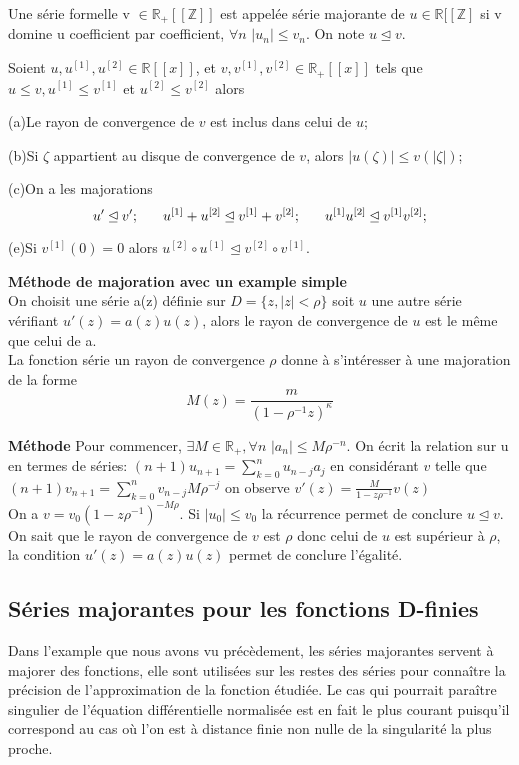 \documentclass[a4paper,10.5pt]{article}
\begin{document}
	\begin{definition} Une série formelle v $\in \mathbb{R}_{+}[[\mathbb{Z}]]$ est appelée série majorante de $ u \in \mathbb{R}[[\mathbb{Z}]$ si v domine u coefficient par coefficient, $\forall n$ $ |u_{n}|\leq v_{n}$. On note $u \unlhd v$.
	\end{definition}
	
	\begin{proposition} Soient $u,u^{[1]},u^{[2]}\in \mathbb{R}[[x]]$, et $v,v^{[1]},v^{[2]} \in \mathbb{R}_{+}[[x]]$ tels que $u\leq v,u^{[1]}\leq v^{[1]}$ et $u^{[2]}\leq v^{[2]}$ alors
		
		(a)Le rayon de convergence de $v$ est inclus dans celui de $u$;
		
		(b)Si $\zeta$ appartient au disque de convergence de $v$, alors $|u(\zeta)|\leq v(|\zeta|)$;
		
		(c)On a les majorations
		\[u' \unlhd v'; \hspace{6mm} u^{[1]}+u^{[2]}\unlhd v^{[1]}+v^{[2]}; \hspace{6mm}u^{[1]}u^{[2]}\unlhd v^{[1]}v^{[2]}; \]
		
		(e)Si $v^{[1]}(0)=0$ alors $ u^{[2]} \circ u^{[1]} \unlhd v^{[2]}\circ v^{[1]}$.
		
	\end{proposition}
	
	\noindent\textbf{Méthode de majoration avec un example simple}\\
	On choisit une série a(z) définie sur $D=\{z,|z|<\rho\}$ soit $u$ une autre série vérifiant $u'(z)=a(z)u(z)$, alors le rayon de convergence de $u$ est le même que celui de a.\\
	La fonction série un rayon de convergence $\rho$ donne à s'intéresser à une majoration de la forme
	\[M(z)=\frac{m}{(1-\rho^{-1} z)^{\kappa}}\] 
	
	\noindent\textbf{Méthode} Pour commencer, $\exists M \in \mathbb{R}_{+}, \forall n$ $|a_{n}|\leq M \rho^{-n}$.
	On écrit la relation sur u en termes de séries: $(n+1)u_{n+1}=\sum_{k=0}^{n}u_{n-j}a_{j}$ en considérant $v$ telle que  $(n+1)v_{n+1}=\sum_{k=0}^{n}v_{n-j}M\rho^{-j}$ on observe $v'(z)=\frac{M}{1-z\rho^{-1}}v(z)$ \\
	On a $v=v_{0}(1-z\rho^{-1})^{-M\rho}$. Si $|u_{0}| \leq v_{0}$ la récurrence permet de conclure $ u\unlhd v$. On sait que le rayon de convergence de $v$ est $\rho$ donc celui de $u$ est supérieur à $\rho$, la condition $u'(z)=a(z)u(z)$ permet de conclure l'égalité.
	
	\subsection{Séries majorantes pour les fonctions D-finies}
	Dans l'example que nous avons vu précèdement, les séries majorantes servent à majorer des fonctions, elle sont utilisées sur les restes des séries pour connaître la précision de l'approximation de la fonction étudiée.
	Le cas qui pourrait paraître singulier de l'équation différentielle normalisée est en fait le plus courant puisqu'il correspond au cas où l'on est à distance finie non nulle de la singularité la plus proche.
	
\end{document}
